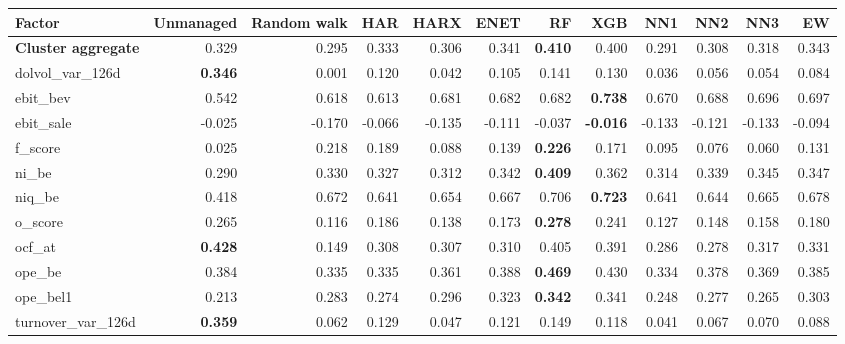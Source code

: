 \begin{landscape}
\begin{longtable}{>{\raggedright\arraybackslash}p{2.6cm}rrrrrrrrrrr}
\hline
Factor & Unmanaged & Random walk & HAR & HARX & ENET & RF & XGB & NN1 & NN2 & NN3 & EW \\
\hline
\textbf{Cluster aggregate} & 0.329 & 0.295 & \cellcolor{blue!10}0.333 & 0.306 & \cellcolor{blue!10}0.341 & \textbf{\cellcolor{blue!10}0.410} & \cellcolor{blue!10}0.400 & 0.291 & 0.308 & 0.318 & \cellcolor{blue!10}0.343 \\
dolvol\_var\_126d & \textbf{0.346} & 0.001 & 0.120 & 0.042 & 0.105 & 0.141 & 0.130 & 0.036 & 0.056 & 0.054 & 0.084 \\
ebit\_bev & 0.542 & 0.618 & 0.613 & \cellcolor{blue!10}0.681 & \cellcolor{blue!10}0.682 & \cellcolor{blue!10}0.682 & \textbf{\cellcolor{blue!10}0.738} & \cellcolor{blue!10}0.670 & \cellcolor{blue!10}0.688 & \cellcolor{blue!10}0.696 & \cellcolor{blue!10}0.697 \\
ebit\_sale & -0.025 & -0.170 & -0.066 & -0.135 & -0.111 & -0.037 & \textbf{\cellcolor{blue!10}-0.016} & -0.133 & -0.121 & -0.133 & -0.094 \\
f\_score & 0.025 & 0.218 & 0.189 & 0.088 & 0.139 & \textbf{\cellcolor{blue!10}0.226} & 0.171 & 0.095 & 0.076 & 0.060 & 0.131 \\
ni\_be & 0.290 & 0.330 & 0.327 & 0.312 & \cellcolor{blue!10}0.342 & \textbf{\cellcolor{blue!10}0.409} & \cellcolor{blue!10}0.362 & 0.314 & \cellcolor{blue!10}0.339 & \cellcolor{blue!10}0.345 & \cellcolor{blue!10}0.347 \\
niq\_be & 0.418 & 0.672 & 0.641 & 0.654 & 0.667 & \cellcolor{blue!10}0.706 & \textbf{\cellcolor{blue!10}0.723} & 0.641 & 0.644 & 0.665 & \cellcolor{blue!10}0.678 \\
o\_score & 0.265 & 0.116 & 0.186 & 0.138 & 0.173 & \textbf{\cellcolor{blue!10}0.278} & 0.241 & 0.127 & 0.148 & 0.158 & 0.180 \\
ocf\_at & \textbf{0.428} & 0.149 & 0.308 & 0.307 & 0.310 & 0.405 & 0.391 & 0.286 & 0.278 & 0.317 & 0.331 \\
ope\_be & 0.384 & 0.335 & 0.335 & 0.361 & \cellcolor{blue!10}0.388 & \textbf{\cellcolor{blue!10}0.469} & \cellcolor{blue!10}0.430 & 0.334 & 0.378 & 0.369 & \cellcolor{blue!10}0.385 \\
ope\_bel1 & 0.213 & 0.283 & 0.274 & \cellcolor{blue!10}0.296 & \cellcolor{blue!10}0.323 & \textbf{\cellcolor{blue!10}0.342} & \cellcolor{blue!10}0.341 & 0.248 & 0.277 & 0.265 & \cellcolor{blue!10}0.303 \\
turnover\_var\_126d & \textbf{0.359} & 0.062 & 0.129 & 0.047 & 0.121 & 0.149 & 0.118 & 0.041 & 0.067 & 0.070 & 0.088 \\

\end{longtable}
\end{landscape}
